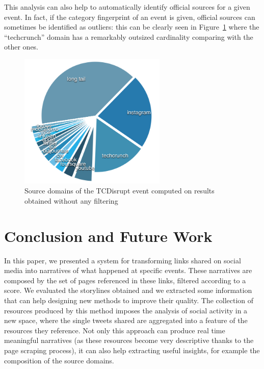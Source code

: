 \documentclass{sig-alternate}
\begin{document}
This analysis can also help to automatically identify official sources for a given event. In fact, if the category fingerprint of an event is given, official sources can sometimes be identified as outliers: this can be clearly seen in Figure~\ref{fig:tcdisrupt_outlier} where the ``techcrunch'' domain has a remarkably outsized cardinality comparing with the other ones.
\begin{figure}[htbp]
  \centering
  \includegraphics[width=7cm]{Figures/tcdisrupt_outlier.png}
  \caption{Source domains of the TCDisrupt event computed on results obtained without any filtering}
  \label{fig:tcdisrupt_outlier}
\end{figure}


\section{Conclusion and Future Work}
\label{sec:conclusions}
In this paper, we presented a system for transforming links shared on social media into narratives of what happened at specific events. These narratives are composed by the set of pages referenced in these links, filtered according to a score. We evaluated the storylines obtained and we extracted some information that can help designing new methods to improve their quality. The collection of resources produced by this method imposes the analysis of social activity in a new space, where the single tweets shared are aggregated into a feature of the resources they reference. Not only this approach can produce real time meaningful narratives (as these resources become very descriptive thanks to the page scraping process), it can also help extracting useful insights, for example the composition of the source domains.
\end{document}
